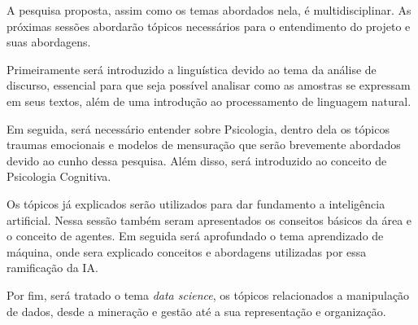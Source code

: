 A pesquisa proposta, assim como os temas abordados nela, é multidisciplinar. As próximas sessões abordarão tópicos necessários para o entendimento do projeto e suas abordagens.

Primeiramente será introduzido a linguística devido ao tema da análise de discurso, essencial para que seja possível analisar como as amostras se expressam em seus textos, além de uma introdução ao processamento de linguagem natural.

Em seguida, será necessário entender sobre Psicologia, dentro dela os tópicos traumas emocionais e modelos de mensuração que serão brevemente abordados devido ao cunho dessa pesquisa. Além disso, será introduzido ao conceito de Psicologia Cognitiva.

Os tópicos já explicados serão utilizados para dar fundamento a inteligência artificial. Nessa sessão também seram apresentados os conseitos básicos da área e o conceito de agentes. Em seguida será aprofundado o tema aprendizado de máquina, onde sera explicado conceitos e abordagens utilizadas por essa ramificação da IA.

Por fim, será tratado o tema \textit{data science}, os tópicos relacionados a manipulação de dados, desde a mineração e gestão até a sua representação e organização.






